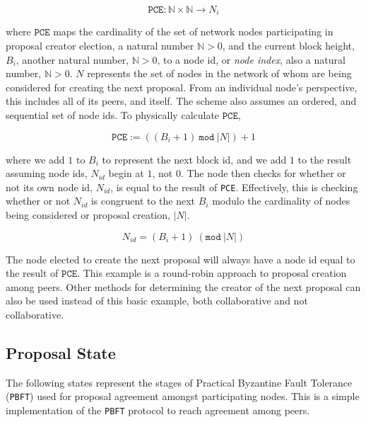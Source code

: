 \documentclass[10pt, titlepage, twocolumn]{report}
\newcommand*{\field}[1]{\mathbb{#1}}%
\begin{document}
\begin{equation}
	\texttt{PCE} :  \field{N} \times \field{N}  \rightarrow N_i
\end{equation}

\hspace*{15pt}
where \( \texttt{PCE} \) maps the cardinality of the set of network nodes participating in proposal creator election, a natural number \(\field{N} > 0\), and the current block height, \( B_i \), another natural number, \(\field{N} > 0\), to a node id, or \textit{node index}, also a natural number, \(\field{N} > 0\). \( N \) represents the set of nodes in the network of whom are being considered for creating the next proposal. From an individual node's perspective, this includes all of its peers, and itself. The scheme also assumes an ordered, and sequential set of node ids. To physically calculate \( \texttt{PCE} \), 

\begin{equation}
	\texttt{PCE} := ((B_i + 1) \: \texttt{mod} \: \vert N \vert) + 1
\end{equation}

\hspace*{15pt}
where we add \(1\) to \(B_i\) to represent the next block id, and we add \(1\) to the result assuming node ids, \(N_{id}\) begin at \(1\), not \(0\). The node then checks for whether or not its own node id, \(N_{id}\), is equal to the result of \texttt{PCE}. Effectively, this is checking whether or not \(N_{id}\) is congruent to the next \(B_i\) modulo the cardinality of nodes being considered or proposal creation, \(\vert N \vert\).  

\begin{equation}
	N_{id} = (B_i +1) \: (\texttt{mod} \: \vert N \vert)
\end{equation}

\hspace*{15pt}
The node elected to create the next proposal will always have a node id equal to the result of \(\texttt{PCE}\). This example is a round-robin approach to proposal creation among peers. Other methods for determining the creator of the next proposal can also be used instead of this basic example, both collaborative and not collaborative.  



\subsection{Proposal State}
\hspace*{15pt}
The following states represent the stages of Practical Byzantine Fault Tolerance (\texttt{PBFT}) used for proposal agreement amongst participating nodes. This is a simple implementation of the \texttt{PBFT} protocol to reach agreement among peers.
\end{document}
